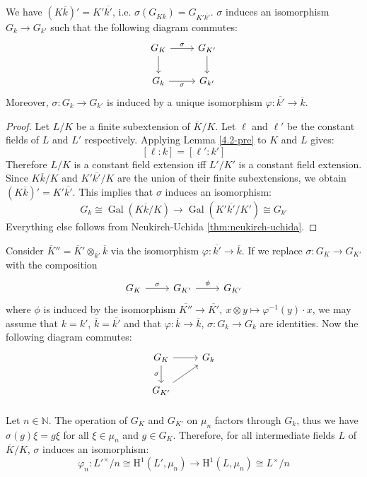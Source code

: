 \begin{lemma}\label{4.2}
We have $(K\overline{k})'=K'\overline{k'}$, i.e. $\sigma(G_{K\overline{k}})=G_{K'\overline{k'}}$. $\sigma$ induces an isomorphism $G_k\to G_{k'}$ such that the following diagram commutes:
\[ \begin{tikzcd}
G_K \ar[r, "\sigma"] \ar[d] & G_{K'}\ar[d]\\
G_k \ar[r, "\sigma"'] & G_{k'}
\end{tikzcd} \]
Moreover, $\sigma:G_k\to G_{k'}$ is induced by a unique isomorphism $\varphi:\overline{k'}\to\overline{k}$.
\end{lemma}

\begin{proof}
Let $L/K$ be a finite subextension of $\overline{K}/K$. Let $\ell$ and $\ell'$ be the constant fields of $L$ and $L'$ respectively. Applying Lemma \ref{4.2-pre} to $K$ and $L$ gives:
\[ [\ell:k] = [\ell':k'] \]
Therefore $L/K$ is a constant field extension iff $L'/K'$ is a constant field extension. Since $K\overline{k}/K$ and $K'\overline{k'}/K$ are the union of their finite subextensions, we obtain $(K\overline{k})' = K'\overline{k'}$. This implies that $\sigma$ induces an isomorphism:
\[G_k \cong \operatorname{Gal}(K\overline{k}/K) \to \operatorname{Gal}(K'\overline{k'}/K')\cong G_{k'}\] 
Everything else follows from Neukirch-Uchida \ref{thm:neukirch-uchida}.
\end{proof}

\begin{remark}
Consider $\overline{K}'' = \overline{K}'\otimes_{\overline{k'}}\overline{k}$ via the isomorphism $\varphi: \overline{k'}\to \overline{k}$. If we replace $\sigma: G_K\to G_{K'}$ with the composition
\[ \begin{tikzcd}
G_K \ar[r, "\sigma"] & G_{K'} \ar[r, "\phi"] & G_{K'}
\end{tikzcd} \]
where $\phi$ is induced by the isomorphism $\overline{K''}\to\overline{K'},\ x\otimes y\mapsto \varphi^{-1}(y)\cdot x$, we may assume that $k=k'$, $\overline{k} = \overline{k'}$ and that $\varphi:\overline{k}\to\overline{k}$, $\sigma: G_k\to G_k$ are identities. Now the following diagram commutes:
\[ \begin{tikzcd}
G_K \ar[r]\ar[d, "\sigma"'] & G_k\\
G_{K'}\ar[ru]
\end{tikzcd} \]
\end{remark}

\paragraph{} Let $n\in\mathbb{N}$. The operation of $G_K$ and $G_{K'}$ on $\mu_n$ factors through $G_k$, thus we have $\sigma(g)\xi = g\xi$ for all $\xi\in\mu_n$ and $g\in G_K$. Therefore, for all intermediate fields $L$ of $\overline{K}/K$, $\sigma$ induces an isomorphism:
\[ \varphi_n:L'^\times/n \cong\mathrm{H}^1(L', \mu_n) \to \mathrm{H}^1(L,\mu_n) \cong L^\times/n \]


